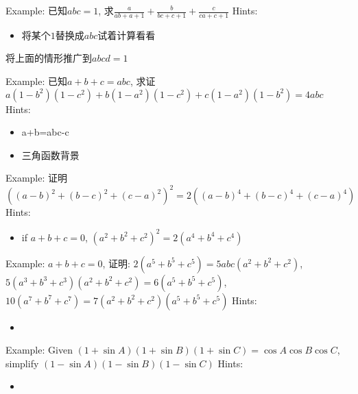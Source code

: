 \clearpage
Example: 已知$abc=1$, 求$\frac{a}{ab+a+1}+\frac{b}{bc+c+1}+\frac{c}{ca+c+1}$  
\clearpage
Hints:
\begin{itemize}
\item 将某个$1$替换成$abc$试着计算看看
\end{itemize}

\clearpage
将上面的情形推广到$abcd=1$


\clearpage
Example: 已知$a+b+c=abc$, 求证$a(1-b^2)(1-c^2)+b(1-a^2)(1-c^2)+c(1-a^2)(1-b^2)
         =4abc$  
\clearpage
Hints:
\begin{itemize}
\item a+b=abc-c
\item 三角函数背景
\end{itemize}


\clearpage
Example: 证明 $((a-b)^2+(b-c)^2+(c-a)^2)^2=2((a-b)^4+(b-c)^4+(c-a)^4)$
\clearpage
Hints:
\begin{itemize}
\item if $a+b+c=0$, $(a^2+b^2+c^2)^2=2(a^4+b^4+c^4)$
\end{itemize}


\clearpage
Example: $a+b+c=0$, 证明:
$2(a^5+b^5+c^5)=5abc(a^2+b^2+c^2)$,
$5(a^3+b^3+c^3)(a^2+b^2+c^2)=6(a^5+b^5+c^5)$,
$10(a^7+b^7+c^7)=7(a^2+b^2+c^2)(a^5+b^5+c^5)$
\clearpage
Hints:
\begin{itemize}
\item 
\end{itemize}


\clearpage
Example: Given $(1+\sin A)(1+\sin B)(1+\sin C)=\cos A\cos B\cos C$,
simplify $(1-\sin A)(1-\sin B)(1-\sin C)$ 
\clearpage
Hints:
\begin{itemize}
\item 
\end{itemize}

















































